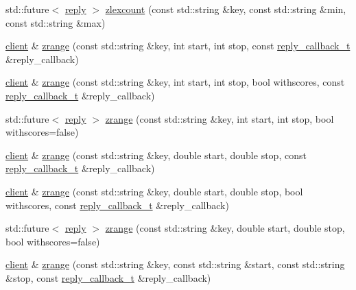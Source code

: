 \begin{DoxyCompactItemize}
\item 
std\+::future$<$ \hyperlink{classcpp__redis_1_1reply}{reply} $>$ \hyperlink{classcpp__redis_1_1client_ace7bbf92a0ea2cac775e5bc66a0d1ea8}{zlexcount} (const std\+::string \&key, const std\+::string \&min, const std\+::string \&max)
\item 
\hyperlink{classcpp__redis_1_1client}{client} \& \hyperlink{classcpp__redis_1_1client_a70025f24f20e81397868467651c804a9}{zrange} (const std\+::string \&key, int start, int stop, const \hyperlink{classcpp__redis_1_1client_a061a1140d36d2eaeda82b09a0bb3f9f2}{reply\+\_\+callback\+\_\+t} \&reply\+\_\+callback)
\item 
\hyperlink{classcpp__redis_1_1client}{client} \& \hyperlink{classcpp__redis_1_1client_a7a86805d2495c3866df9095ea71ab842}{zrange} (const std\+::string \&key, int start, int stop, bool withscores, const \hyperlink{classcpp__redis_1_1client_a061a1140d36d2eaeda82b09a0bb3f9f2}{reply\+\_\+callback\+\_\+t} \&reply\+\_\+callback)
\item 
std\+::future$<$ \hyperlink{classcpp__redis_1_1reply}{reply} $>$ \hyperlink{classcpp__redis_1_1client_a75f0e330b851c7bfcf373a7ef9f30cb8}{zrange} (const std\+::string \&key, int start, int stop, bool withscores=false)
\item 
\hyperlink{classcpp__redis_1_1client}{client} \& \hyperlink{classcpp__redis_1_1client_a24f15cede24bdb482167b1ea00db3160}{zrange} (const std\+::string \&key, double start, double stop, const \hyperlink{classcpp__redis_1_1client_a061a1140d36d2eaeda82b09a0bb3f9f2}{reply\+\_\+callback\+\_\+t} \&reply\+\_\+callback)
\item 
\hyperlink{classcpp__redis_1_1client}{client} \& \hyperlink{classcpp__redis_1_1client_ab37fd922b733c5fa64f7a0dc4be22efe}{zrange} (const std\+::string \&key, double start, double stop, bool withscores, const \hyperlink{classcpp__redis_1_1client_a061a1140d36d2eaeda82b09a0bb3f9f2}{reply\+\_\+callback\+\_\+t} \&reply\+\_\+callback)
\item 
std\+::future$<$ \hyperlink{classcpp__redis_1_1reply}{reply} $>$ \hyperlink{classcpp__redis_1_1client_a0286a2953aeaec8c23d0e292fe2fccc2}{zrange} (const std\+::string \&key, double start, double stop, bool withscores=false)
\item 
\hyperlink{classcpp__redis_1_1client}{client} \& \hyperlink{classcpp__redis_1_1client_ad24c21a0344652d821d0628c68057ecb}{zrange} (const std\+::string \&key, const std\+::string \&start, const std\+::string \&stop, const \hyperlink{classcpp__redis_1_1client_a061a1140d36d2eaeda82b09a0bb3f9f2}{reply\+\_\+callback\+\_\+t} \&reply\+\_\+callback)

\end{DoxyCompactItemize}

